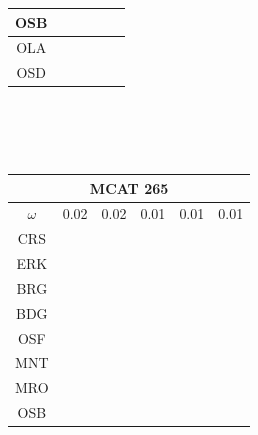 \documentclass[12pt]{article}
\begin{document}
\begin{landscape}
\begin{figure}
{\begin{minipage}[c]{0.3\textwidth}
\begin{tabular}{|c|c|c|c|c|c|}
        OSB&\cellcolor[HTML]{FF7F00}&\cellcolor[HTML]{984EA3}&\cellcolor[HTML]{984EA3}&\cellcolor[HTML]{984EA3}&\cellcolor[HTML]{FF7F00}\\ \hline %
        OLA&\cellcolor[HTML]{FF7F00}&\cellcolor[HTML]{984EA3}&\cellcolor[HTML]{FF7F00}&\cellcolor[HTML]{984EA3}&\cellcolor[HTML]{FF7F00}\\ \hline %
        OSD&\cellcolor[HTML]{FF7F00}&\cellcolor[HTML]{FF7F00}&\cellcolor[HTML]{FF7F00}&\cellcolor[HTML]{984EA3}&\cellcolor[HTML]{FFFF33}\\ \hline %
\end{tabular}\\$~$\\$~$\\
\hspace*{-5cm}
\begin{tabular}{|c|c|c|c|c|c|}%
         \hline \multicolumn{6}{|c|}{MCAT 265} \\ \hline
         $\omega$&0.02&0.02&0.01&0.01&0.01 \\ \hline %
        CRS&\cellcolor[HTML]{E41A1C}&\cellcolor[HTML]{E41A1C}&\cellcolor[HTML]{E41A1C}&\cellcolor[HTML]{E41A1C}&\cellcolor[HTML]{E41A1C}\\ \hline %
        ERK&\cellcolor[HTML]{E41A1C}&\cellcolor[HTML]{E41A1C}&\cellcolor[HTML]{377EB8}&\cellcolor[HTML]{E41A1C}&\cellcolor[HTML]{E41A1C}\\ \hline %
        BRG&\cellcolor[HTML]{377EB8}&\cellcolor[HTML]{377EB8}&\cellcolor[HTML]{377EB8}&\cellcolor[HTML]{E41A1C}&\cellcolor[HTML]{E41A1C}\\ \hline %
        BDG&\cellcolor[HTML]{377EB8}&\cellcolor[HTML]{377EB8}&\cellcolor[HTML]{377EB8}&\cellcolor[HTML]{377EB8}&\cellcolor[HTML]{377EB8}\\ \hline %
        OSF&\cellcolor[HTML]{377EB8}&\cellcolor[HTML]{377EB8}&\cellcolor[HTML]{4DAF4A}&\cellcolor[HTML]{4DAF4A}&\cellcolor[HTML]{377EB8}\\ \hline %
        MNT&\cellcolor[HTML]{4DAF4A}&\cellcolor[HTML]{4DAF4A}&\cellcolor[HTML]{984EA3}&\cellcolor[HTML]{984EA3}&\cellcolor[HTML]{4DAF4A}\\ \hline %
        MRO&\cellcolor[HTML]{4DAF4A}&\cellcolor[HTML]{4DAF4A}&\cellcolor[HTML]{FF7F00}&\cellcolor[HTML]{FF7F00}&\cellcolor[HTML]{4DAF4A}\\ \hline %
        OSB&\cellcolor[HTML]{984EA3}&\cellcolor[HTML]{984EA3}&\cellcolor[HTML]{FF7F00}&\cellcolor[HTML]{FF7F00}&\cellcolor[HTML]{4DAF4A}\\ \hline %

\end{tabular}
\end{minipage}}
\end{figure}
\end{landscape}
\end{document}
